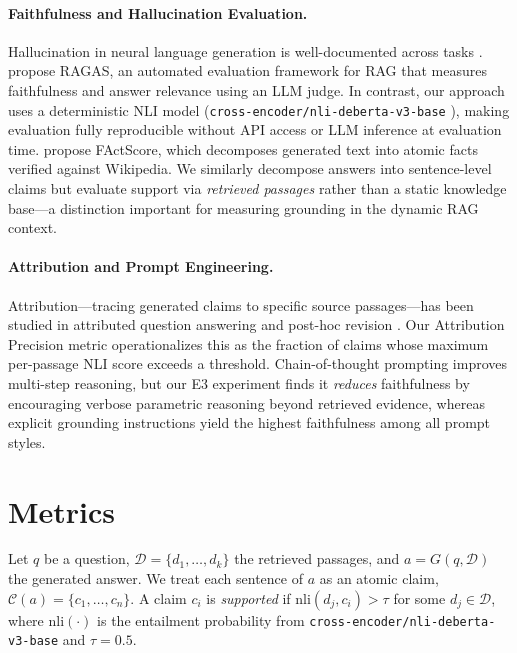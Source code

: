 \documentclass[11pt]{article}
\begin{document}
\paragraph{Faithfulness and Hallucination Evaluation.}
Hallucination in neural language generation is well-documented across tasks
\cite{ji2023survey}.
\citet{es-etal-2024-ragas} propose RAGAS, an automated evaluation framework
for RAG that measures faithfulness and answer relevance using an LLM judge.
In contrast, our approach uses a deterministic NLI model
(\texttt{cross-encoder/nli-deberta-v3-base} \cite{he2020deberta}),
making evaluation fully reproducible without API access or LLM inference
at evaluation time.
\citet{min-etal-2023-factscore} propose FActScore, which decomposes
generated text into atomic facts verified against Wikipedia.
We similarly decompose answers into sentence-level claims but evaluate
support via \emph{retrieved passages} rather than a static knowledge
base---a distinction important for measuring grounding in the dynamic
RAG context.

\paragraph{Attribution and Prompt Engineering.}
Attribution---tracing generated claims to specific source passages---has
been studied in attributed question answering \cite{bohnet-etal-2022-attributed}
and post-hoc revision \cite{gao-etal-2023-rarr}.
Our Attribution Precision metric operationalizes this as the fraction of claims
whose maximum per-passage NLI score exceeds a threshold.
Chain-of-thought prompting \cite{wei2022chain} improves multi-step reasoning,
but our E3 experiment finds it \emph{reduces} faithfulness by encouraging
verbose parametric reasoning beyond retrieved evidence, whereas explicit
grounding instructions yield the highest faithfulness among all prompt styles.

\section{Metrics}
\label{sec:metrics}

Let $q$ be a question, $\mathcal{D}=\{d_1,\ldots,d_k\}$ the retrieved
passages, and $a = G(q,\mathcal{D})$ the generated answer.
We treat each sentence of $a$ as an atomic claim,
$\mathcal{C}(a)=\{c_1,\ldots,c_n\}$.
A claim $c_i$ is \emph{supported} if
$\text{nli}(d_j, c_i) > \tau$ for some $d_j \in \mathcal{D}$,
where $\text{nli}(\cdot)$ is the entailment probability from
\texttt{cross-encoder/nli-deberta-v3-base} and $\tau{=}0.5$.
\end{document}
